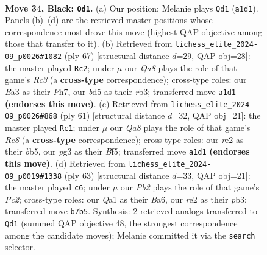 \documentclass[11pt]{article}
\begin{document}
\clearpage

\begin{figure}[p]\centering
\begin{subfigure}{0.46\textwidth}\centering
\resizebox{\linewidth}{!}{%
\newchessgame
\chessboard[
  setfen={8/pp4kp/6p1/3B4/8/b5P1/4RPKP/q7 b - - 3 34},
  showmover=false,
  pgfstyle=straightmove, color=movearrow, markmove={a1-d1}
]}
\caption{}
\end{subfigure}\hfill
\begin{subfigure}{0.46\textwidth}\centering
\resizebox{\linewidth}{!}{%
\newchessgame
\chessboard[
  setfen={8/4kppp/2r1p3/1p6/8/1R4P1/5PKP/5B2 b - - 1 34},
  showmover=false,
  pgfstyle=straightmove, color=movearrow, markmove={c6-c2}
]}
\caption{}
\end{subfigure}
\\[4pt]
\begin{subfigure}{0.46\textwidth}\centering
\resizebox{\linewidth}{!}{%
\newchessgame
\chessboard[
  setfen={6k1/5pp1/7p/pB3b2/2P5/R5P1/5PPK/4r3 b - - 3 31},
  showmover=false,
  pgfstyle=straightmove, color=movearrow, markmove={e1-c1}
]}
\caption{}
\end{subfigure}\hfill
\begin{subfigure}{0.46\textwidth}\centering
\resizebox{\linewidth}{!}{%
\newchessgame
\chessboard[
  setfen={6k1/p1p4p/b5p1/4B3/8/1P4P1/P4PP1/6K1 b - - 0 32},
  showmover=false,
  pgfstyle=straightmove, color=movearrow, markmove={c7-c6}
]}
\caption{}
\end{subfigure}
\caption{\textbf{Move 34, Black: \texttt{Qd1}.} (a) Our position; Melanie plays \texttt{Qd1} (\texttt{a1d1}). Panels (b)--(d) are the retrieved master positions whose correspondence most drove this move (highest QAP objective among those that transfer to it). (b) Retrieved from \texttt{lichess\_elite\_2024-09\_p0026\#1082} (ply 67) [structural distance $d$=29, QAP obj=28]: the master played \texttt{Rc2}; under $\mu$ our \emph{Qa8} plays the role of that game's \emph{Rc3} (a \textbf{cross-type} correspondence); cross-type roles: our \emph{B}a3 as their \emph{P}h7, our \emph{b}d5 as their \emph{r}b3; transferred move \texttt{a1d1} \textbf{(endorses this move)}. (c) Retrieved from \texttt{lichess\_elite\_2024-09\_p0026\#868} (ply 61) [structural distance $d$=32, QAP obj=21]: the master played \texttt{Rc1}; under $\mu$ our \emph{Qa8} plays the role of that game's \emph{Re8} (a \textbf{cross-type} correspondence); cross-type roles: our \emph{r}e2 as their \emph{b}b5, our \emph{p}g3 as their \emph{B}f5; transferred move \texttt{a1d1} \textbf{(endorses this move)}. (d) Retrieved from \texttt{lichess\_elite\_2024-09\_p0019\#1338} (ply 63) [structural distance $d$=33, QAP obj=21]: the master played \texttt{c6}; under $\mu$ our \emph{Pb2} plays the role of that game's \emph{Pc2}; cross-type roles: our \emph{Q}a1 as their \emph{B}a6, our \emph{r}e2 as their \emph{p}b3; transferred move \texttt{b7b5}. Synthesis: 2 retrieved analogs transferred to \texttt{Qd1} (summed QAP objective 48, the strongest correspondence among the candidate moves); Melanie committed it via the \texttt{search} selector.}
\label{fig:thought-m67}
\end{figure}
\end{document}
